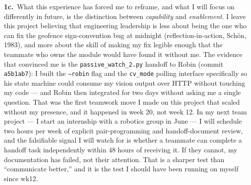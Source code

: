\textbf{1c.}~What this experience has forced me to reframe, and what I will focus on differently in future, is the distinction between \emph{capability} and \emph{enablement}. I leave this project believing that engineering leadership is less about being the one who can fix the geofence sign-convention bug at midnight (reflection-in-action, Sch\"on, 1983), and more about the skill of making my fix legible enough that the teammate who owns the module would have found it without me. The evidence that convinced me is the \texttt{passive\_watch\_2.py} handoff to Robin (commit \texttt{a5b1ab7}): I built the \texttt{--robin} flag and the \texttt{cv\_mode} polling interface specifically so his state machine could consume my vision output over HTTP without touching my code --- and Robin then integrated for two days without asking me a single question. That was the first teamwork move I made on this project that scaled without my presence, and it happened in week 20, not week 12. In my next team project --- I start an internship with a robotics group in June --- I will schedule two hours per week of explicit pair-programming and handoff-document review, and the falsifiable signal I will watch for is whether a teammate can complete a handoff task independently within 48 hours of receiving it. If they cannot, my documentation has failed, not their attention. That is a sharper test than ``communicate better,'' and it is the test I should have been running on myself since wk12.
